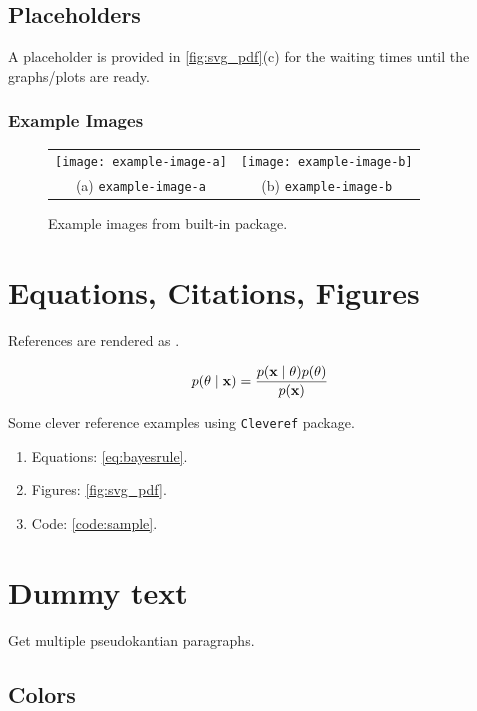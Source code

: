 \documentclass{article}
\begin{document}
\subsection{Placeholders}

A placeholder is provided in \cref{fig:svg_pdf}(c) for the waiting times until the graphs/plots are ready.

\subsubsection{Example Images}

\begin{figure}[!ht]
\centering
\begin{tabular}{cc}
    \texttt{[image: example-image-a]} & \texttt{[image: example-image-b]} \\
    (a) \texttt{example-image-a} & (b) \texttt{example-image-b}
\end{tabular}
\caption{Example images from built-in package.}
\label{fig:my_label}
\end{figure}

\section{Equations, Citations, Figures}

References are rendered as \citet{icml2021-vargp}.

\begin{align}
p(\theta \mid {\ensuremath{\boldsymbol{\mathbf{x}}}}) = \frac{p({\boldsymbol{\mathbf{x}}}\mid\theta)p(\theta)}{p({\boldsymbol{\mathbf{x}}})} \label{eq:bayesrule}
\end{align}

Some clever reference examples using \texttt{Cleveref} package.

\begin{enumerate}
\item Equations: \cref{eq:bayesrule}.
\item Figures: \cref{fig:svg_pdf}.
\item Code: \cref{code:sample}.
\end{enumerate}

\section{Dummy text}

Get multiple pseudokantian paragraphs.

\kant[1-2]

\subsection{Colors}
\end{document}
